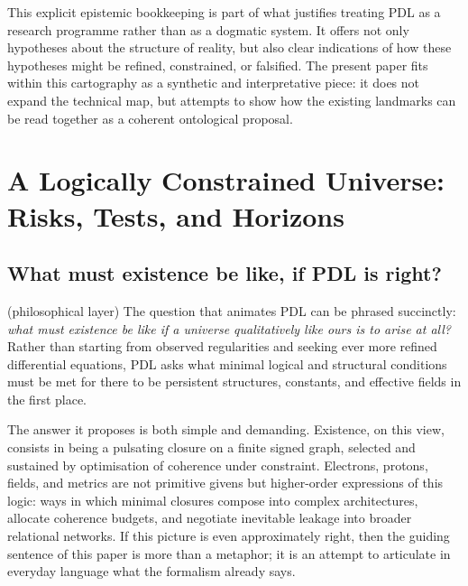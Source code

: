 \documentclass[11pt,a4paper]{article}
\theoremstyle{definition}
\begin{document}
This explicit epistemic bookkeeping is part of what justifies treating PDL as a research programme rather than as a dogmatic system. It offers not only hypotheses about the structure of reality, but also clear indications of how these hypotheses might be refined, constrained, or falsified.\cite{Laubscher_PDL_Position_2024,Laubscher_PDL_GlobalMapping_v6_2024} The present paper fits within this cartography as a synthetic and interpretative piece: it does not expand the technical map, but attempts to show how the existing landmarks can be read together as a coherent ontological proposal.

\section{A Logically Constrained Universe: Risks, Tests, and Horizons}
\label{sec:risks_tests}

\subsection{What must existence be like, if PDL is right?}

(philosophical layer) The question that animates PDL can be phrased succinctly: \emph{what must existence be like if a universe qualitatively like ours is to arise at all?} Rather than starting from observed regularities and seeking ever more refined differential equations, PDL asks what minimal logical and structural conditions must be met for there to be persistent structures, constants, and effective fields in the first place.\cite{Laubscher_EmergencePhysicalReality_2024,Laubscher_IntroPDL_2024,Laubscher_PDL_Position_2024}

The answer it proposes is both simple and demanding. Existence, on this view, consists in being a pulsating closure on a finite signed graph, selected and sustained by optimisation of coherence under constraint. Electrons, protons, fields, and metrics are not primitive givens but higher-order expressions of this logic: ways in which minimal closures compose into complex architectures, allocate coherence budgets, and negotiate inevitable leakage into broader relational networks.\cite{Laubscher_MinimalClosures_46_2024,Laubscher_ProtonArch_v2_2024,Laubscher_EffectiveFields_2024,Laubscher_UniversalCoherenceLeakage_2024} If this picture is even approximately right, then the guiding sentence of this paper is more than a metaphor; it is an attempt to articulate in everyday language what the formalism already says.
\end{document}
